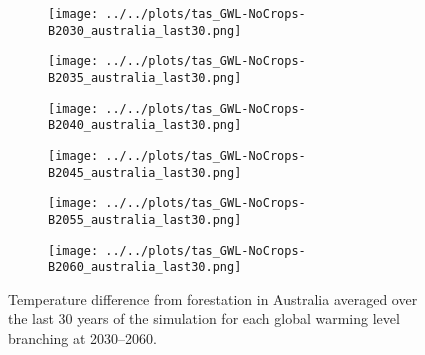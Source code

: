 \documentclass[]{article}
\begin{document}
\begin{figure}[H]
    \centering
    \begin{subfigure}[b]{0.4\linewidth}
        \texttt{[image: ../../plots/tas\_GWL-NoCrops-B2030\_australia\_last30.png]}
    \end{subfigure}
    \begin{subfigure}[b]{0.4\linewidth}
        \texttt{[image: ../../plots/tas\_GWL-NoCrops-B2035\_australia\_last30.png]}
    \end{subfigure}
    \begin{subfigure}[b]{0.4\linewidth}
        \texttt{[image: ../../plots/tas\_GWL-NoCrops-B2040\_australia\_last30.png]}
    \end{subfigure}
    \begin{subfigure}[b]{0.4\linewidth}
        \texttt{[image: ../../plots/tas\_GWL-NoCrops-B2045\_australia\_last30.png]}
    \end{subfigure}
    \begin{subfigure}[b]{0.4\linewidth}
        \texttt{[image: ../../plots/tas\_GWL-NoCrops-B2055\_australia\_last30.png]}
    \end{subfigure}
    \begin{subfigure}[b]{0.4\linewidth}
        \texttt{[image: ../../plots/tas\_GWL-NoCrops-B2060\_australia\_last30.png]}
    \end{subfigure}
    \caption{Temperature difference from forestation in Australia averaged over the last 30 years of the simulation for each global warming level branching at 2030--2060.  
    }
    \label{fig:tas_australia}
\end{figure}
\end{document}
